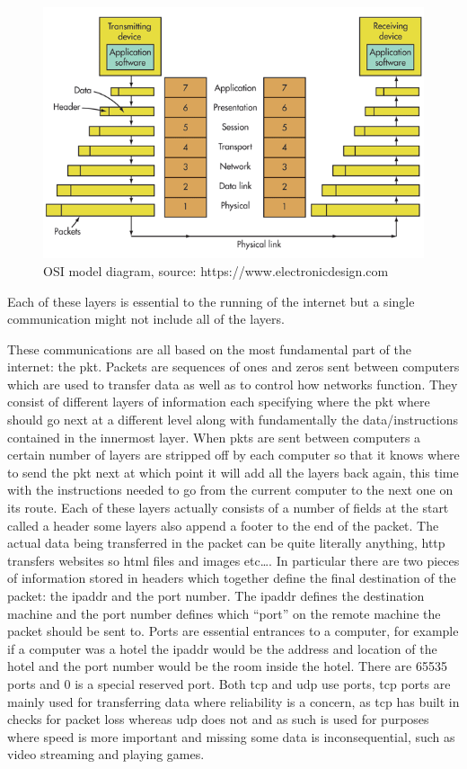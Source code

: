 \documentclass[titlepage]{article}
\begin{document}
\begin{figure}
  \centering
  \includegraphics[width=\textwidth]{screenshots/osi_model.png}
  \caption{%
    OSI model diagram, source: https://www.electronicdesign.com
  }\label{osi_model}
\end{figure}

Each of these layers is essential to the running of the internet but a single communication
might not include all of the layers.

These communications are all based on the most fundamental part of the internet: the \gls{pkt}.
Packets are sequences of ones and zeros sent between computers which are used to transfer
data as well as to control how networks function. They consist of different layers of 
information each specifying where the \gls{pkt} where should go next at a different level
along with fundamentally the data/instructions contained in the innermost layer. When \glspl{pkt}
are sent between computers a certain number of layers are stripped off by each computer so
that it knows where to send the \gls{pkt} next at which point it will add all the layers back
again, this time with the instructions needed to go from the current computer to the next
one on its route. Each of these layers actually consists of a number of fields at the start
called a \gls{header} some layers also append a footer to the end of the packet. The actual
data being transferred in the packet can be quite literally anything, \gls{http} transfers
websites so \gls{html} files and images etc\ldots. In particular there are two pieces of
information stored in headers which together define the final destination of the packet:
the \gls{ipaddr} and the \gls{port} number. The \gls{ipaddr} defines the destination machine
and the \gls{port} number defines which ``port'' on the remote machine the packet should
be sent to. Ports are essential entrances to a computer, for example if a computer
was a hotel the \gls{ipaddr} would be the address and location of the hotel and the
\gls{port} number would be the room inside the hotel. There are 65535 \glspl{port} and 0 is a
special reserved port. Both \gls{tcp} and \gls{udp} use \glspl{port}, \gls{tcp} \glspl{port}
are mainly used for transferring data where reliability is a concern, as \gls{tcp} has built in
checks for packet loss whereas \gls{udp} does not and as such is used for purposes where speed
is more important and missing some data is inconsequential, such as video streaming and playing
games.
\end{document}

